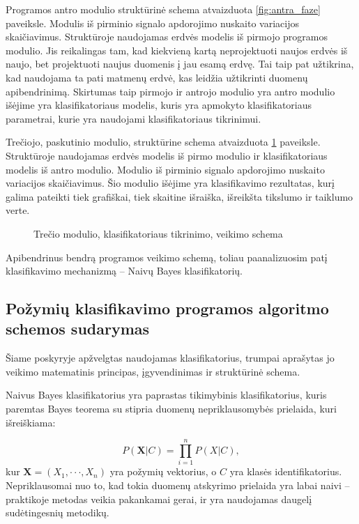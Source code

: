 \documentclass[]{vgtuef}
\begin{document}
Programos antro modulio struktūrinė schema atvaizduota \ref{fig:antra_faze} paveiksle. Modulis iš pirminio signalo apdorojimo nuskaito variacijos skaičiavimus. Struktūroje naudojamas erdvės modelis iš pirmojo programos modulio. Jis reikalingas tam, kad kiekvieną kartą neprojektuoti naujos erdvės iš naujo, bet projektuoti naujus duomenis į jau esamą erdvę. Tai taip pat užtikrina, kad naudojama ta pati matmenų erdvė, kas leidžia užtikrinti duomenų apibendrinimą. Skirtumas taip pirmojo ir antrojo modulio yra antro modulio išėjime yra klasifikatoriaus modelis, kuris yra apmokyto klasifikatoriaus parametrai, kurie yra naudojami klasifikatoriaus tikrinimui.

Trečiojo, paskutinio modulio, struktūrine schema atvaizduota \ref{fig:trecia_faze} paveiksle. Struktūroje naudojamas erdvės modelis iš pirmo modulio ir klasifikatoriaus modelis iš antro modulio. Modulio iš pirminio signalo apdorojimo nuskaito variacijos skaičiavimus. Šio modulio išėjime yra klasifikavimo rezultatas, kurį galima pateikti tiek grafiškai, tiek skaitine išraiška, išreikšta tikslumo ir taiklumo verte.

\begin{figure}
  \centering
  
  \caption{Trečio modulio, klasifikatoriaus tikrinimo, veikimo schema}
  \label{fig:trecia_faze}
\end{figure}

Apibendrinus bendrą programos veikimo schemą, toliau paanalizuosim patį klasifikavimo mechanizmą -- Naivų Bayes klasifikatorių.

\subsection{Požymių klasifikavimo programos algoritmo schemos sudarymas}
\label{subsec:class_scheme}

Šiame poskyryje apžvelgtas naudojamas klasifikatorius, trumpai aprašytas jo veikimo matematinis principas, įgyvendinimas ir struktūrinė schema.

Naivus Bayes klasifikatorius \cite{R22230} yra paprastas tikimybinis klasifikatorius, kuris paremtas Bayes teorema su stipria duomenų nepriklausomybės prielaida, kuri išreiškiama:

\begin{equation}
	P(\mathbf{X}|C) = \prod_{i=1}^{n} P(X|C),
\end{equation}
kur $\mathbf{X} = (X_1, \cdot \cdot \cdot, X_n)$ yra požymių vektorius, o $C$ yra klasės identifikatorius. Nepriklausomai nuo to, kad tokia duomenų atskyrimo prielaida yra labai naivi -- praktikoje metodas veikia pakankamai gerai, ir yra naudojamas daugelį sudėtingesnių metodikų.
\end{document}
